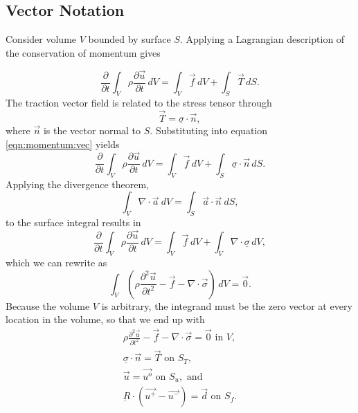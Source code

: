 \subsection{Vector Notation}

Consider volume $V$ bounded by surface $S$. Applying a Lagrangian
description of the conservation of momentum gives

\begin{equation}
\frac{\partial}{\partial t}\int_{V}\rho\frac{\partial\vec{u}}{\partial t}\, dV=\int_{V}\overrightarrow{f}\, dV+\int_{S}\overrightarrow{T}\, dS.\label{eqn:momentum:vec}
\end{equation}
The traction vector field is related to the stress tensor through
\begin{equation}
\overrightarrow{T}=\underline{\sigma}\cdot\overrightarrow{n},
\end{equation}
where $\overrightarrow{n}$ is the vector normal to $S$. Substituting
into equation \ref{eqn:momentum:vec} yields
\begin{equation}
\frac{\partial}{\partial t}\int_{V}\rho\frac{\partial\overrightarrow{u}}{\partial t}\, dV=\int_{V}\overrightarrow{f}\, dV+\int_{S}\underline{\sigma}\cdot\overrightarrow{n}\, dS.
\end{equation}
Applying the divergence theorem,
\begin{equation}
\int_{V}\nabla\cdot\overrightarrow{a}\: dV=\int_{S}\overrightarrow{a}\cdot\overrightarrow{n}\: dS,
\end{equation}
to the surface integral results in
\begin{equation}
\frac{\partial}{\partial t}\int_{V}\rho\frac{\partial\overrightarrow{u}}{\partial t}\, dV=\int_{V}\overrightarrow{f}\, dV+\int_{V}\nabla\cdot\underline{\sigma}\, dV,
\end{equation}
which we can rewrite as
\begin{equation}
\int_{V}\left(\rho\frac{\partial^{2}\overrightarrow{u}}{\partial t^{2}}-\overrightarrow{f}-\nabla\cdot\overrightarrow{\sigma}\right)\, dV=\vec{0}.
\end{equation}
Because the volume $V$ is arbitrary, the integrand must be the zero
vector at every location in the volume, so that we end up with
\begin{gather}
\rho\frac{\partial^{2}\overrightarrow{u}}{\partial t^{2}}-\overrightarrow{f}-\nabla\cdot\overrightarrow{\sigma}=\vec{0}\text{ in }V,\\
\underline{\sigma}\cdot\overrightarrow{n}=\overrightarrow{T}\text{ on }S_{T}\text{,}\\
\overrightarrow{u}=\overrightarrow{u^{o}}\text{ on }S_{u},\text{ and}\\
\underbar{R}\cdot(\vec{u^{+}}-\vec{u^{-}})=\vec{d}\text{ on }S_{f}.
\end{gather}
